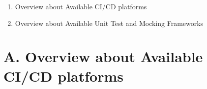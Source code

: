 
\addchap{\langanhang}

{\Large
\begin{enumerate}[label=\Alph*.]
	\item Overview about Available CI/CD platforms
	\item Overview about Available Unit Test and Mocking Frameworks
\end{enumerate}
}
\pagebreak
\section*{A. Overview about Available CI/CD platforms}
\label{appendix-a}
{\renewcommand{\arraystretch}{2}}%
\setlength\tabcolsep{5pt} %
